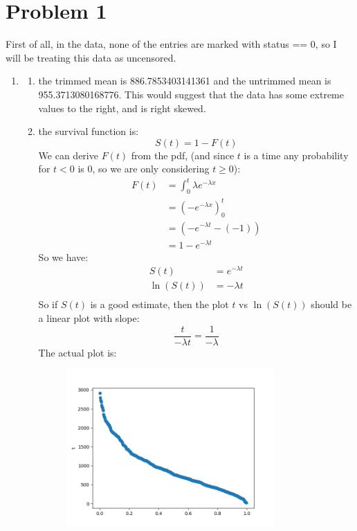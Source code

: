 \documentclass{article}
\title{\thetitle}
\author{\theauthor}
\begin{document}
\maketitle
\section*{Problem 1}
First of all, in the data, none of the entries are marked with status == 0, so I will be treating this data as uncensored. \\
\begin{enumerate}
\item 
\begin{enumerate}[label=\alph*)]
\item the trimmed mean is 886.7853403141361 and the untrimmed mean is 955.3713080168776. This would suggest that the data has some extreme values to the right, and is right skewed. \\
\item the survival function is: \\
\[
S(t) = 1 - F(t)
\]
We can derive $F(t)$ from the pdf, (and since $t$ is a time any probability for $t < 0$ is 0, so we are only considering $t \geq 0$): \\
\begin{align*}
F(t) &= \int_{0}^{t}\lambda e^{-\lambda x} \\
&= (-e^{-\lambda x})_{0}^{t} \\
&= (-e^{-\lambda t} - (-1)) \\
&= 1 - e^{-\lambda t}
\end{align*}
So we have: \\
\begin{align*}
S(t) &= e^{-\lambda t} \\
\ln(S(t)) &= -\lambda t \\ 
\end{align*}
So if $S(t)$ is a good estimate, then the plot $t$ vs $\ln(S(t))$ should be a linear plot with slope: \\
\[
\frac{t}{-\lambda t} = \frac{1}{-\lambda}
\]
The actual plot is: \\
\begin{figure}[htbp]
    \centering
    \includegraphics[width=0.8\textwidth]{fig_1.png}

\end{figure}
\end{enumerate}
\end{enumerate}
\end{document}
